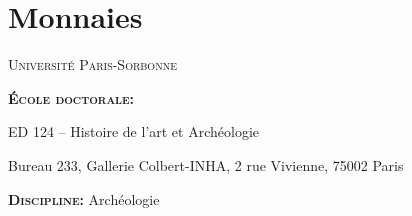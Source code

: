 \documentclass[14pt]{these}
\begin{document}
\part{Monnaies}
\newcommand{\monnaie}[2][]{
  \setkeys{bdd}{#1}
  
  \begin{tabular}{p{0.6\textwidth} p{0.4\textwidth}}
    \textbf{Référence:} \BDDref, 
    \textbf{Valeur:} \BDDvalue, 
    \textbf{Atelier monétaire:} \BDDartist\newline
    \textbf{Magistrat:} \BDDmagistrate, 
    \textbf{Datation:} \BDDdate,
    \textbf{Droit:} \BDDfront, \textbf{Inscription:} \BDDfrontInscr\newline
    \textbf{Revers:} \BDDback, \textbf{Inscription:} \BDDbackInscr
    &
    \def\empty{bdd-monnaies/.jpg}
    \def\tmp{#2}
    \ifx\tmp\empty\else
    \raisebox{-0.9\height}{\texttt{[image: \#2]}}
    \fi
  \end{tabular}
}


\thirdcover
\fourthcover

\null\vfill
\textsc{Université Paris-Sorbonne}
\medskip

\textbf{\textsc{École doctorale}}\textbf{:}

ED 124 -- Histoire de l'art et Archéologie

Bureau 233, Gallerie Colbert-INHA, 2 rue Vivienne, 75002 Paris
\medskip

\textbf{\textsc{Discipline}}\textbf{:} Archéologie
\end{document}
